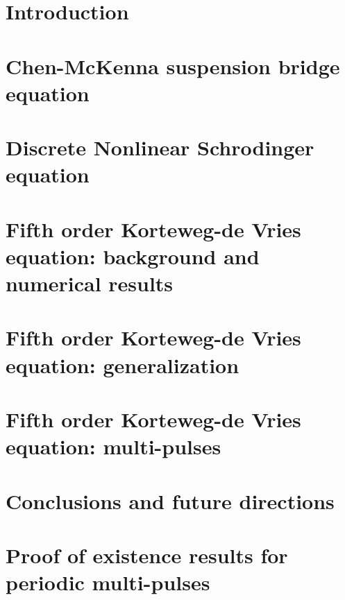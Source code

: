 \documentclass[11pt,reqno,oneside]{amsbook}
\theoremstyle{plain}
\theoremstyle{definition}
\theoremstyle{remark}
\numberwithin{section}{chapter}
\numberwithin{equation}{chapter}
\numberwithin{figure}{chapter}
\begin{document}
\mainmatter

\chapter{Introduction}\label{chapter:intro}


\chapter{Chen-McKenna suspension bridge equation}\label{chapter:chen}


\chapter{Discrete Nonlinear Schrodinger equation}\label{chapter:DNLS}


\chapter{Fifth order Korteweg-de Vries equation: background and numerical results}\label{chapter:kdv5}



\chapter{Fifth order Korteweg-de Vries equation: generalization}\label{chapter:kdv5general}



\chapter{Fifth order Korteweg-de Vries equation: multi-pulses}\label{chapter:kdv5multi}


\chapter{Conclusions and future directions}\label{chapter:conclusions}


\appendix
\chapter{Proof of existence results for periodic multi-pulses}\label{perexistproof}


\backmatter



\end{document}
